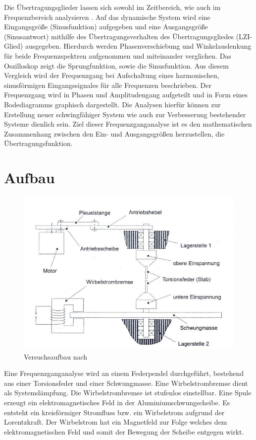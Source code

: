 \documentclass[a4paper,12pt]{scrartcl}
\begin{document}
Die Übertragungsglieder lassen sich sowohl im Zeitbereich, wie auch im Frequenzbereich analysieren \cite{RegTech}.
Auf das dynamische System wird eine Eingangsgröße (Sinusfunktion) aufgegeben und eine Ausgangsgröße (Sinusantwort) mithilfe des Übertragungs\-verhalten des Übertragungsgliedes (LZI-Glied) ausgegeben.
Hierdurch werden Phasenverschiebung und Winkelauslenkung für beide Frequenzspektren aufgenommen und miteinander verglichen.
Das Oszilloskop zeigt die Sprungfunktion, sowie die Sinusfunktion.
Aus diesem Vergleich wird der Frequenzgang bei Aufschaltung eines harmonischen, sinusförmigen Eingangssignales für alle Frequenzen beschrieben.
Der Frequenzgang wird in Phasen und Amplitudengang aufgeteilt und in Form eines Bodediagramms graphisch dargestellt.
Die Analysen hierfür können zur Erstellung neuer schwingfähiger System wie auch zur Verbesserung bestehender Systeme dienlich sein.
Ziel dieser Frequenzganganalyse ist es den mathematischen Zusammenhang zwischen den Ein- und Ausgangsgrößen herzustellen, die Übertragungsfunktion.

\section{Aufbau}

\begin{figure}[h]
\centering
\includegraphics[width=\textwidth]{aufbau.png}
\caption{Versuchsaufbau nach \cite{skript}}
\label{fig:aufbau}
\end{figure}

Eine Frequenzganganalyse wird an einem Federpendel durchgeführt, bestehend aus einer Torsionsfeder und einer Schwungmasse.
Eine Wirbelstrombremse dient als Systemdämpfung. Die Wirbelstrombremse ist stufenlos einstellbar. Eine Spule erzeugt ein elektromagnetisches
Feld in der Aluminiumschwungscheibe. Es entsteht ein kreisförmiger Stromfluss bzw. ein Wirbelstrom aufgrund der Lorentzkraft.
Der Wirbelstrom hat ein Magnetfeld zur Folge welches dem elektromagnetischen Feld und somit der Bewegung der Scheibe entgegen wirkt.
\end{document}
